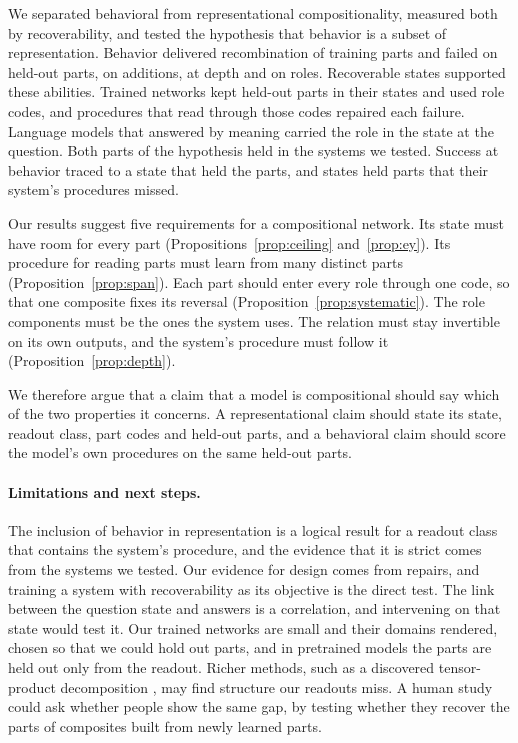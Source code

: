 \documentclass[10pt]{article}
\theoremstyle{plain}
\theoremstyle{remark}
\begin{document}
We separated behavioral from representational compositionality, measured both by recoverability, and tested the hypothesis that behavior is a subset of representation. Behavior delivered recombination of training parts and failed on held-out parts, on additions, at depth and on roles. Recoverable states supported these abilities. Trained networks kept held-out parts in their states and used role codes, and procedures that read through those codes repaired each failure. Language models that answered by meaning carried the role in the state at the question. Both parts of the hypothesis held in the systems we tested. Success at behavior traced to a state that held the parts, and states held parts that their system's procedures missed.

Our results suggest five requirements for a compositional network. Its state must have room for every part (Propositions~\ref{prop:ceiling} and~\ref{prop:ey}). Its procedure for reading parts must learn from many distinct parts (Proposition~\ref{prop:span}). Each part should enter every role through one code, so that one composite fixes its reversal (Proposition~\ref{prop:systematic}). The role components must be the ones the system uses. The relation must stay invertible on its own outputs, and the system's procedure must follow it (Proposition~\ref{prop:depth}).

We therefore argue that a claim that a model is compositional should say which of the two properties it concerns. A representational claim should state its state, readout class, part codes and held-out parts, and a behavioral claim should score the model's own procedures on the same held-out parts.

\paragraph{Limitations and next steps.} The inclusion of behavior in representation is a logical result for a readout class that contains the system's procedure, and the evidence that it is strict comes from the systems we tested. Our evidence for design comes from repairs, and training a system with recoverability as its objective is the direct test. The link between the question state and answers is a correlation, and intervening on that state would test it. Our trained networks are small and their domains rendered, chosen so that we could hold out parts, and in pretrained models the parts are held out only from the readout. Richer methods, such as a discovered tensor-product decomposition \citep{mccoy2019}, may find structure our readouts miss. A human study could ask whether people show the same gap, by testing whether they recover the parts of composites built from newly learned parts.
\end{document}
